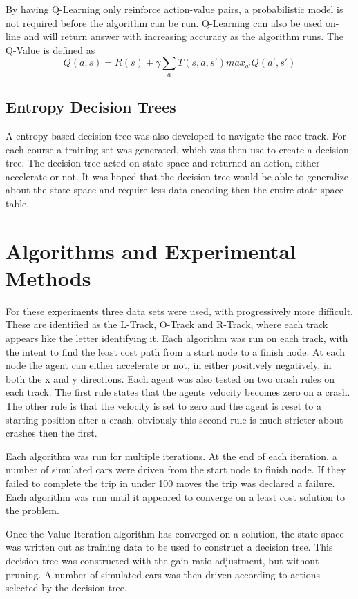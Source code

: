 \documentclass[12pt,letterpaper]{article}
\begin{document}
By having Q-Learning only reinforce action-value pairs, a probabilistic model is not required before the algorithm can be run. Q-Learning can also be used on-line and will return answer with increasing accuracy as the algorithm runs. The Q-Value is defined as 
\[
Q(a,s) = R(s) + \gamma \sum_{a}T(s,a,s')max_{a'}Q(a',s')
\]

\subsection{Entropy Decision Trees}
A entropy based decision tree was also developed to navigate the race track. For each course a training set was generated, which was then use to create a decision tree. The decision tree acted on state space and returned an action, either accelerate or not. It was hoped that the decision tree would be able to generalize about the state space and require less data encoding then the entire state space table.  

\section{Algorithms and Experimental Methods}
For these experiments three data sets were used, with progressively more difficult. These are identified as the L-Track, O-Track and R-Track, where each track appears like the letter identifying it. Each algorithm was run on each track, with the intent to find the least cost path from a start node to a finish node. At each node the agent can either accelerate or not, in either positively negatively, in both the x and y directions. Each agent was also tested on two crash rules on each track. The first rule states that the agents velocity becomes zero on a crash. The other rule is that the velocity is set to zero and the agent is reset to a starting position after a crash, obviously this second rule is much stricter about crashes then the first. 

Each algorithm was run for multiple iterations. At the end of each iteration, a number of simulated cars were driven from the start node to finish node. If they failed to complete the trip in under 100 moves the trip was declared a failure. Each algorithm was run until it appeared to converge on a least cost solution to the problem. 

Once the Value-Iteration algorithm has converged on a solution, the state space was written out as training data to be used to construct a decision tree. This decision tree was constructed with the gain ratio adjustment, but without pruning. A number of simulated cars was then driven according to actions selected by the decision tree. 
\end{document}
